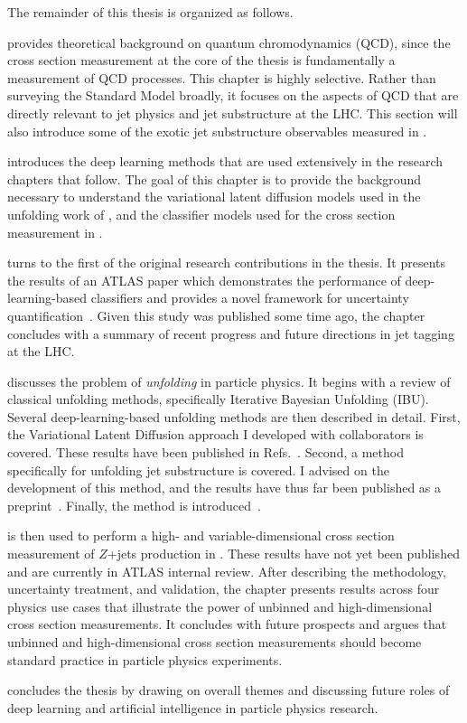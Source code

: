 The remainder of this thesis is organized as follows.

 provides theoretical background on quantum chromodynamics (QCD), since the cross section measurement at the core of the thesis is fundamentally a measurement of QCD processes.
This chapter is highly selective.
Rather than surveying the Standard Model broadly, it focuses on the aspects of QCD that are directly relevant to jet physics and jet substructure at the LHC.
This section will also introduce some of the exotic jet substructure observables measured in .

 introduces the deep learning methods that are used extensively in the research chapters that follow.
The goal of this chapter is to provide the background necessary to understand the variational latent diffusion models used in the unfolding work of , and the classifier models used for the cross section measurement in .

 turns to the first of the original research contributions in the thesis.
It presents the results of an ATLAS paper which demonstrates the performance of deep-learning-based classifiers and provides a novel framework for uncertainty quantification~\cite{ATLAS:2024rua}.
Given this study was published some time ago, the chapter concludes with a summary of recent progress and future directions in jet tagging at the LHC.

 discusses the problem of \textit{unfolding} in particle physics.
It begins with a review of classical unfolding methods, specifically Iterative Bayesian Unfolding (IBU).
Several deep-learning-based unfolding methods are then described in detail.
First, the Variational Latent Diffusion approach I developed with collaborators is covered.
These results have been published in Refs.~\cite{Shmakov:2023kjj,Shmakov:2024gkd}.
Second, a method specifically for unfolding jet substructure is covered.
I advised on the development of this method, and the results have thus far been published as a preprint~\cite{Petitjean:2025tgk}.
Finally, the \Omnifold method is introduced~\cite{Andreassen:2019cjw}.

\Omnifold is then used to perform a high- and variable-dimensional cross section measurement of $Z$+jets production in .
These results have not yet been published and are currently in ATLAS internal review.
After describing the methodology, uncertainty treatment, and validation, the chapter presents results across four physics use cases that illustrate the power of unbinned and high-dimensional cross section measurements.
It concludes with future prospects and argues that unbinned and high-dimensional cross section measurements should become standard practice in particle physics experiments.

 concludes the thesis by drawing on overall themes and discussing future roles of deep learning and artificial intelligence in particle physics research.